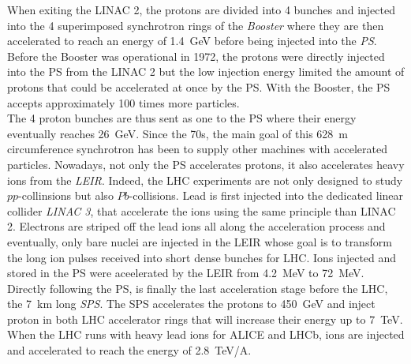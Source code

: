 	When exiting the LINAC 2, the protons are divided into 4 bunches and injected into the 4 superimposed synchrotron rings of the \textit{Booster} where they are then accelerated to reach an energy of \SI{1.4}{GeV} before being injected into the \textit{PS}. Before the Booster was operational in 1972, the protons were directly injected into the PS from the LINAC 2 but the low injection energy limited the amount of protons that could be accelerated at once by the PS. With the Booster, the PS accepts approximately 100 times more particles.\\
	
	The 4 proton bunches are thus sent as one to the PS where their energy eventually reaches \SI{26}{GeV}. Since the 70s, the main goal of this \SI{628}{m} circumference synchrotron has been to supply other machines with accelerated particles. Nowadays, not only the PS accelerates protons, it also accelerates heavy ions from the \textit{\acf{LEIR}}. Indeed, the LHC experiments are not only designed to study $pp$-collinsions but also $Pb$-collisions. Lead is first injected into the dedicated linear collider \textit{LINAC 3}, that accelerate the ions using the same principle than LINAC 2. Electrons are striped off the lead ions all along the acceleration process and eventually, only bare nuclei are injected in the LEIR whose goal is to transform the long ion pulses received into short dense bunches for LHC. Ions injected and stored in the PS were aceelerated by the LEIR from \SI{4.2}{MeV} to \SI{72}{MeV}.\\
	
	Directly following the PS, is finally the last acceleration stage before the LHC, the \SI{7}{km} long \textit{SPS}. The SPS accelerates the protons to \SI{450}{GeV} and inject proton in both LHC accelerator rings that will increase their energy up to \SI{7}{TeV}. When the LHC runs with heavy lead ions for ALICE and LHCb, ions are injected and accelerated to reach the energy of \SI{2.8}{TeV/A}.\\
	
